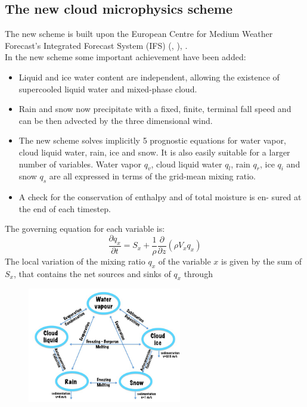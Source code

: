 {\subsection{The new cloud microphysics scheme}

The new scheme is built upon the European Centre for Medium Weather Forecast's Integrated Forecast System (IFS) (\citet{tiedtke:93}, \citet{tompkins:07}), \citet{nogherotto:14}. \\
In the new scheme some important achievement have been added:
\begin{itemize}
\item Liquid and ice water content are independent, allowing the existence of supercooled liquid water and mixed-phase cloud.
\item Rain and snow now precipitate with a fixed, finite, terminal fall speed and can be then advected by the three dimensional wind.
\item The new scheme solves implicitly 5 prognostic equations for water vapor, cloud liquid water, rain, ice and snow. It is also easily suitable for a larger number of variables. Water vapor $q_v$, cloud liquid water $q_l$, rain $q_r$, ice $q_i$ and snow $q_s$ are all expressed in terms of the grid-mean mixing ratio.
\item A check for the conservation of enthalpy and of total moisture is en- sured at the end of each timestep.
\end{itemize}
The governing equation for each variable is:
\begin{equation}
\frac{\partial q_x}{\partial t}= S_x +\frac{1}{\rho}\frac{\partial}{\partial z}(\rho V_x q_x)
\end{equation}
The local variation of the mixing ratio $q_x$ of the variable $x$ is given by the sum of $S_x$, that contains the net sources and sinks of $q_x$ through 
\begin{figure} [htpb!]%
\begin{center}
\includegraphics[width=0.6\textwidth]{scheme_var2.jpg}

\end{center}
\end{figure}}
